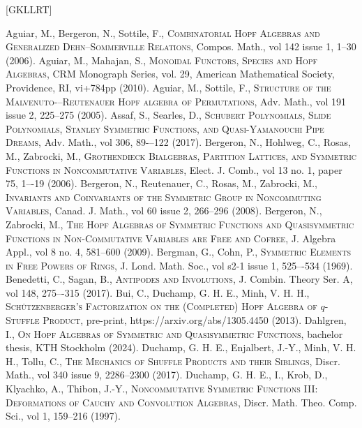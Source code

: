 \documentclass{article}
\theoremstyle{definition}
\begin{document}
\begin{thebibliography}{[GKLLRT]}

\bibitem[ABS]{[ABS]} Aguiar, M., Bergeron, N., Sottile, F., \textsc{Combinatorial Hopf Algebras and Generalized Dehn--Sommerville Relations}, Compos. Math., vol 142 issue 1, 1--30 (2006).
\bibitem[AgM]{[AgM]} Aguiar, M., Mahajan, S., \textsc{Monoidal Functors, Species and Hopf Algebras}, CRM Monograph Series, vol. 29, American Mathematical Society, Providence, RI, vi+784pp (2010).
\bibitem[AgS]{[AgS]} Aguiar, M., Sottile, F., \textsc{Structure of the Malvenuto-–Reutenauer Hopf algebra of Permutations}, Adv. Math., vol 191 issue 2, 225--275 (2005).
\bibitem[AsS]{[AsS]} Assaf, S., Searles, D., \textsc{Schubert Polynomials, Slide Polynomials, Stanley Symmetric Functions, and Quasi-Yamanouchi Pipe Dreams}, Adv. Math., vol 306, 89-–122 (2017).
\bibitem[BHRZ]{[BHRZ]} Bergeron, N., Hohlweg, C., Rosas, M., Zabrocki, M., \textsc{Grothendieck Bialgebras, Partition Lattices, and Symmetric Functions in Noncommutative Variables}, Elect. J. Comb., vol 13 no. 1, paper 75, 1–-19 (2006).
\bibitem[BRRZ]{[BRRZ]} Bergeron, N., Reutenauer, C., Rosas, M., Zabrocki, M., \textsc{Invariants and Coinvariants of the Symmetric Group in Noncommuting Variables}, Canad. J. Math., vol 60 issue 2, 266--296 (2008).
\bibitem[BZ]{[BZ]} Bergeron, N., Zabrocki, M., \textsc{The Hopf Algebras of Symmetric Functions and Quasisymmetric Functions in Non-Commutative Variables are Free and Cofree}, J. Algebra Appl., vol 8 no. 4, 581--600 (2009).
\bibitem[BC]{[BC]} Bergman, G., Cohn, P., \textsc{Symmetric Elements in Free Powers of Rings}, J. Lond. Math. Soc., vol s2-1 issue 1, 525–-534 (1969).
\bibitem[BS]{[BS]} Benedetti, C., Sagan, B., \textsc{Antipodes and Involutions}, J. Combin. Theory Ser. A, vol 148, 275–-315 (2017).
\bibitem[BDM]{[BDM]} Bui, C., Duchamp, G. H. E., Minh, V. H. H., \textsc{Sch\"{u}tzenberger’s Factorization on the (Completed) Hopf Algebra of $q$-Stuffle Product}, pre-print, https://arxiv.org/abs/1305.4450 (2013).
\bibitem[D]{[D]} Dahlgren, I., \textsc{On Hopf Algebras of Symmetric and Quasisymmetric Functions}, bachelor thesis, KTH Stockholm (2024).
\bibitem[DEMT]{[DEMT]} Duchamp, G. H. E., Enjalbert, J.-Y., Minh, V. H. H., Tollu, C., \textsc{The Mechanics of Shuffle Products and their Siblings}, Discr. Math., vol 340 issue 9, 2286--2300 (2017).
\bibitem[DKKT]{[DKKT]} Duchamp, G. H. E., I., Krob, D., Klyachko, A., Thibon, J.-Y., \textsc{Noncommutative Symmetric Functions III: Deformations of Cauchy and Convolution Algebras}, Discr. Math. Theo. Comp. Sci., vol 1, 159--216 (1997).

\end{thebibliography}
\end{document}
